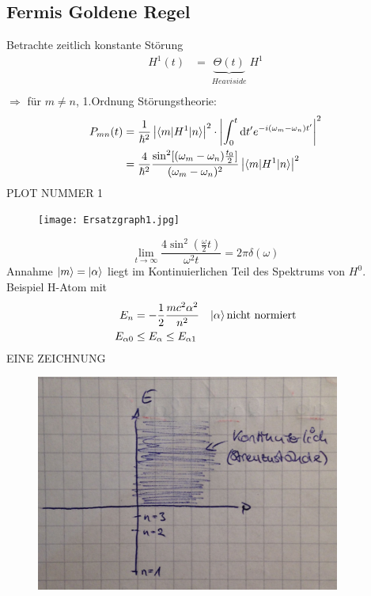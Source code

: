 \subsection{Fermis Goldene Regel}
	Betrachte zeitlich konstante Störung
		\begin{align*}
			H^1(t) &= \underbrace{\Theta (t)}_{\substack{Heaviside}} H^1 \\
		\end{align*}
	$\Rightarrow$ für $m \neq n$, 1.Ordnung Störungstheorie:
		\begin{align*}
			P_{mn}(t) 
			&= \frac{1}{\hbar^2} \left| \braket{m | H^1 | n}\right|^2 
			\cdot \left| \int_{0}^{t} \mathrm{d} t' e^{-i(\omega_m-\omega_n) t'} \right|^2 \\
			&= \frac{4}{\hbar^2} \frac{\sin^2[(\omega_m-\omega_n)
			\frac{t_0}{2}]}{(\omega_m-\omega_n)^2} 
			\left| \braket{m | H^1 | n}\right|^2
		\end{align*}
	PLOT NUMMER 1
	\begin{figure} [h]
		\begin{center}
			\texttt{[image: Ersatzgraph1.jpg]}
		\end{center}
	\end{figure}
		\begin{equation*}
			\lim\limits_{t \rightarrow \infty} \frac{4 \sin^2(\frac{\omega}{2} t)}{\omega^2 t} = 2 \pi \delta (\omega)
		\end{equation*}
	Annahme $\ket{m} = \ket{\alpha}$ liegt im Kontinuierlichen Teil des Spektrums von $H^0$. Beispiel H-Atom mit
		\begin{align*}
			E_n &= - \frac{1}{2} \frac{m c^2 \alpha^2}{n^2} &
			\ket{\alpha} \text{nicht normiert} \\
			E_{\alpha 0} &\leq E_\alpha \leq E_{\alpha 1}
		\end{align*}
	EINE ZEICHNUNG
	\begin{figure} [h]
		\begin{center}
			\includegraphics[width=10cm]{Ersatzgraph2.jpg}
		\end{center}
	\end{figure}

